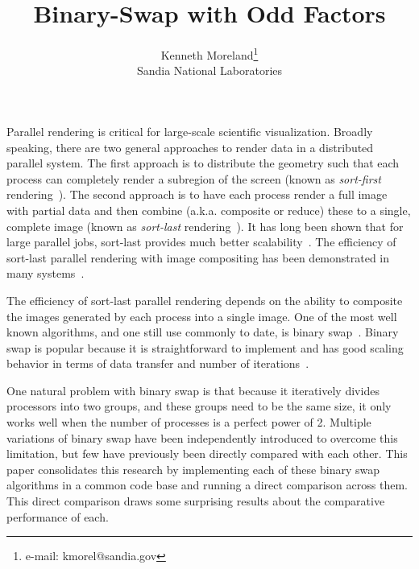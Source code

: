 \documentclass{vgtc}                          %
\title{Binary-Swap with Odd Factors}
\author{
  Kenneth Moreland\thanks{e-mail: kmorel@sandia.gov}\\
  \scriptsize Sandia National Laboratories
}
\newcommand*{\lcite}[1]{~\cite{#1}}
\newcommand*{\keyterm}[1]{\emph{#1}}
\newcommand{\textalgorithm}[1]{\textsf{#1}\xspace}
\newcommand{\binaryswap}{\textalgorithm{binary swap}}
\newcommand{\Binaryswap}{\textalgorithm{Binary swap}}
\begin{document}


\maketitle

Parallel rendering is critical for large-scale scientific visualization.
Broadly speaking, there are two general approaches to render data in a distributed parallel system.
The first approach is to distribute the geometry such that each process can completely render a subregion of the screen (known as \keyterm{sort-first} rendering\lcite{Molnar1994}).
The second approach is to have each process render a full image with partial data and then combine (a.k.a. composite or reduce) these to a single, complete image (known as \keyterm{sort-last} rendering\lcite{Molnar1994}).
It has long been shown that for large parallel jobs, sort-last provides much better scalability\lcite{Wylie2001}.
The efficiency of sort-last parallel rendering with image compositing has been demonstrated in many systems\lcite{Childs2010,Moreland2011:SC,Peterka2009:ICPP,Peterka2013}.

The efficiency of sort-last parallel rendering depends on the ability to composite the images generated by each process into a single image.
One of the most well known algorithms, and one still use commonly to date, is \binaryswap\lcite{BinarySwap1}.
\Binaryswap is popular because it is straightforward to implement and has good scaling behavior in terms of data transfer and number of iterations\lcite{Peterka2013}.

One natural problem with \binaryswap is that because it iteratively divides processors into two groups, and these groups need to be the same size, it only works well when the number of processes is a perfect power of 2.
Multiple variations of \binaryswap have been independently introduced to overcome this limitation, but few have previously been directly compared with each other.
This paper consolidates this research by implementing each of these \binaryswap algorithms in a common code base and running a direct comparison across them.
This direct comparison draws some surprising results about the comparative performance of each.
\end{document}
